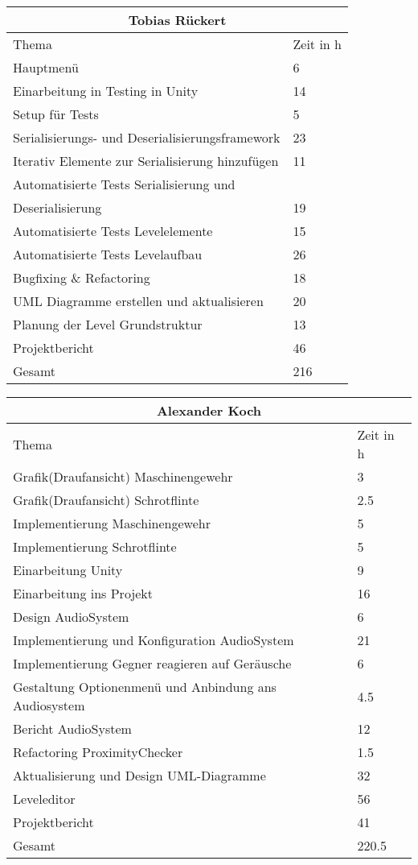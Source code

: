 \begin{tabular}{|l|l|}
	\hline
	\multicolumn{2}{|c|}{Tobias Rückert} \\
	\hline
	Thema & Zeit in h \\
  	\hline
	Hauptmenü & 6 \\
	\hline
	Einarbeitung in Testing in Unity & 14 \\
	\hline
	Setup für Tests & 5 \\
	\hline
	Serialisierungs- und Deserialisierungsframework & 23 \\
	\hline
	Iterativ Elemente zur Serialisierung hinzufügen & 11 \\
	\hline
	Automatisierte Tests Serialisierung und & \\
	Deserialisierung & 19 \\
	\hline
	Automatisierte Tests Levelelemente & 15 \\
	\hline
	Automatisierte Tests Levelaufbau & 26 \\
	\hline
	Bugfixing \& Refactoring & 18 \\
	\hline
	UML Diagramme erstellen und aktualisieren & 20 \\
	\hline
	Planung der Level Grundstruktur & 13 \\
	\hline
	Projektbericht & 46 \\
	\hline
	Gesamt & 216 \\
	\hline
\end{tabular}
\clearpage
\begin{tabular}{|l|l|}
	\hline
	\multicolumn{2}{|c|}{Alexander Koch} \\
	\hline
	Thema & Zeit in h \\
  	\hline
  	Grafik(Draufansicht) Maschinengewehr & 3 \\
  	\hline
  	Grafik(Draufansicht) Schrotflinte & 2.5 \\
  	\hline
  	Implementierung Maschinengewehr & 5 \\
  	\hline
  	Implementierung Schrotflinte & 5 \\
  	\hline
  	Einarbeitung Unity & 9 \\
  	\hline
  	Einarbeitung ins Projekt & 16 \\
  	\hline
  	Design AudioSystem & 6 \\
  	\hline
  	Implementierung und Konfiguration AudioSystem & 21 \\
  	\hline
  	Implementierung Gegner reagieren auf Geräusche & 6 \\
  	\hline
  	Gestaltung Optionenmenü und Anbindung ans Audiosystem & 4.5 \\
  	\hline
  	Bericht AudioSystem & 12 \\
	\hline
	Refactoring ProximityChecker & 1.5 	\\
	\hline
	Aktualisierung und Design UML-Diagramme & 32 \\
	\hline
	Leveleditor & 56 \\
	\hline
	Projektbericht & 41 \\
	\hline
	Gesamt & 220.5 \\
	\hline
\end{tabular}